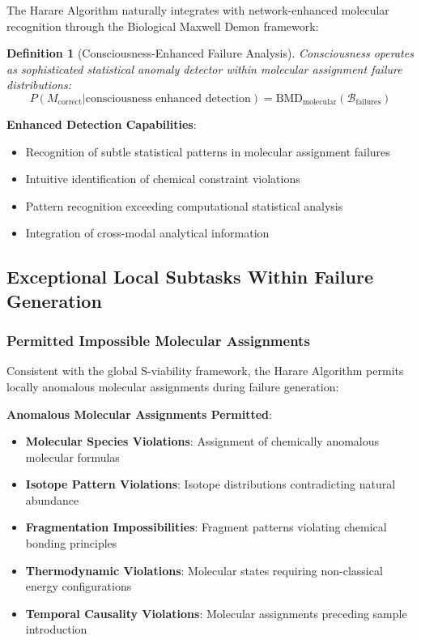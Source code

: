 \documentclass[11pt,a4paper]{article}
\newtheorem{definition}[theorem]{Definition}
\theoremstyle{remark}
\begin{document}
The Harare Algorithm naturally integrates with network-enhanced molecular recognition through the Biological Maxwell Demon framework:

\begin{definition}[Consciousness-Enhanced Failure Analysis]
Consciousness operates as sophisticated statistical anomaly detector within molecular assignment failure distributions:
$$P(M_{\text{correct}} | \text{consciousness enhanced detection}) = \text{BMD}_{\text{molecular}}(\mathcal{B}_{\text{failures}})$$
\end{definition}

\textbf{Enhanced Detection Capabilities}:
\begin{itemize}
\item Recognition of subtle statistical patterns in molecular assignment failures
\item Intuitive identification of chemical constraint violations
\item Pattern recognition exceeding computational statistical analysis
\item Integration of cross-modal analytical information
\end{itemize}

\subsection{Exceptional Local Subtasks Within Failure Generation}

\subsubsection{Permitted Impossible Molecular Assignments}

Consistent with the global S-viability framework, the Harare Algorithm permits locally anomalous molecular assignments during failure generation:

\textbf{Anomalous Molecular Assignments Permitted}:
\begin{itemize}
\item \textbf{Molecular Species Violations}: Assignment of chemically anomalous molecular formulas
\item \textbf{Isotope Pattern Violations}: Isotope distributions contradicting natural abundance
\item \textbf{Fragmentation Impossibilities}: Fragment patterns violating chemical bonding principles
\item \textbf{Thermodynamic Violations}: Molecular states requiring non-classical energy configurations
\item \textbf{Temporal Causality Violations}: Molecular assignments preceding sample introduction
\end{itemize}
\end{document}
